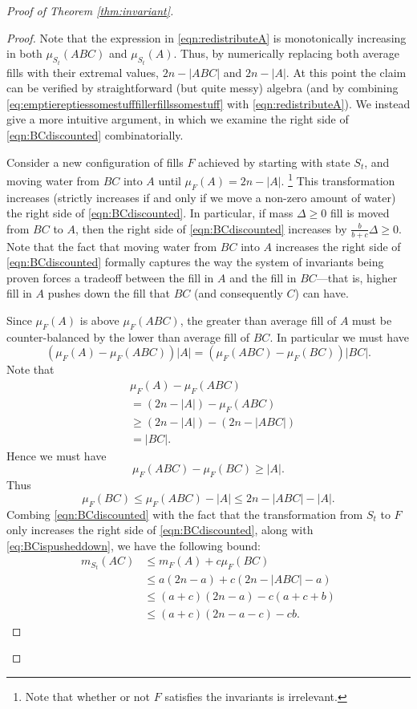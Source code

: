 \documentclass[twocolumn]{article}[10pt]
\begin{document}
\begin{proof}[Proof of Theorem \ref{thm:invariant}]
\begin{proof}
Note that the expression in \eqref{eqn:redistributeA} is monotonically
increasing in both $\mu_{S_t}(ABC)$ and $\mu_{S_t}(A)$. 
Thus, by numerically replacing both average fills with
their extremal values, $2n-|ABC|$ and $2n-|A|$. At this point the claim can be verified by straightforward (but quite messy) algebra (and by combining \eqref{eq:emptiereptiessomestufffillerfillssomestuff} with \eqref{eqn:redistributeA}). We instead give a more intuitive argument, in which we examine the right side of \eqref{eqn:BCdiscounted} combinatorially.

 Consider a new configuration of fills $F$ achieved by starting with state
  $S_t$, and moving water from $BC$ into $A$ until $\mu_{F}(A) = 2n-|A|$.
  \footnote{Note that whether or not $F$ satisfies the invariants is irrelevant.}
  This transformation increases (strictly increases if and only if we move a
  non-zero amount of water) the right side of \eqref{eqn:BCdiscounted}. 
  In particular, if mass $\Delta \ge 0$ fill is moved from
  $BC$ to $A$, then the right side of \eqref{eqn:BCdiscounted} increases by $\frac{b}{b+c} \Delta \ge 0$. 
  Note that the fact that moving water from $BC$ into $A$ increases the right side of \eqref{eqn:BCdiscounted} formally captures the way the system of invariants being proven forces a tradeoff between the fill in $A$ and the fill in $BC$---that is, higher fill in $A$ pushes down the fill that $BC$ (and consequently $C$) can have.

  Since $\mu_F(A)$ is above $\mu_{F}(ABC)$, the greater than average fill of
  $A$ must be counter-balanced by the lower than average fill of $BC$. In
  particular we must have
  $$(\mu_F(A) - \mu_F(ABC))|A| = (\mu_F(ABC) -\mu_F(BC))|BC|.$$
  Note that 
  \begin{align*}
  & \mu_F(A) -\mu_F(ABC) \\
  &= (2n-|A|) - \mu_F(ABC) \\
  &\ge (2n-|A|) - (2n-|ABC|) \\
  &= |BC|.    
  \end{align*}
  Hence we must have 
  $$\mu_F(ABC) - \mu_F(BC) \ge |A|.$$
  Thus 
  \begin{equation}
      \mu_F(BC) \le \mu_F(ABC) - |A| \le 2n-|ABC| -|A|.
      \label{eq:BCispusheddown}
  \end{equation}
  Combing \eqref{eqn:BCdiscounted} with the fact that the transformation from $S_t$ to $F$ only increases the right side of \eqref{eqn:BCdiscounted}, along with \eqref{eq:BCispusheddown}, we have the following bound:
  \begin{align}
    m_{S_t}(AC)
  &\le m_{F}(A) + c\mu_{F}(BC) \nonumber \\
  &\le a(2n-a) + c(2n-|ABC|-a) \nonumber \\
  &\le (a+c)(2n-a) - c(a+c+b) \nonumber \\
  &\le (a+c)(2n-a-c) - cb. \label{eq:eqnwithcb}
  \end{align}
  

\end{proof}
\end{proof}
\end{document}
